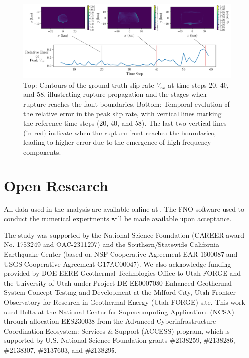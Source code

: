 \documentclass[draft]{agujournal2019}
\begin{document}
\begin{figure}
    \centering
    \includegraphics[width=0.9\linewidth]{error_time_2.png}
    \caption{\label{fig:rel_err_peak} Top: Contours of the ground-truth slip rate $V_{zx}$ at time steps 20, 40, and 58, illustrating rupture propagation and the stages when rupture reaches the fault boundaries. Bottom: Temporal evolution of the relative error in the peak slip rate, with vertical lines marking the reference time steps (20, 40, and 58). The last two vertical lines (in red) indicate when the rupture front reaches the boundaries, leading to higher error due to the emergence of high-frequency components.}
\end{figure}



\section*{Open Research}
All data used in the analysis are available online at . The FNO software used to conduct the numerical experiments will be made available upon acceptance.




\acknowledgments
The study was supported by the National Science Foundation (CAREER award No. 1753249 and OAC-2311207) and the Southern/Statewide California Earthquake Center (based on NSF Cooperative Agreement EAR-1600087 and USGS Cooperative Agreement G17AC00047). We also acknowledge funding provided by DOE EERE Geothermal Technologies Office to Utah FORGE and the University of Utah under Project DE-EE0007080 Enhanced Geothermal System Concept Testing and Development at the Milford City, Utah Frontier Observatory for Research in Geothermal Energy (Utah FORGE) site. This work used Delta at the National Center for Supercomputing Applications (NCSA) through allocation EES230038 from the Advanced Cyberinfrastructure Coordination Ecosystem: Services \& Support (ACCESS) program, which is supported by U.S. National Science Foundation grants \#2138259, \#2138286, \#2138307, \#2137603, and \#2138296.



\end{document}
